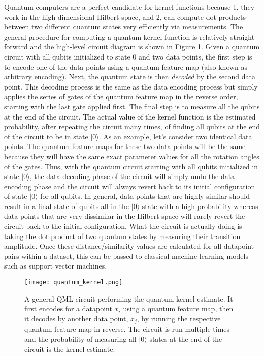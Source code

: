 \documentclass[
	a4paper, %
	10pt, %
	unnumberedsections, %
	twoside, %
]{LTJournalArticle}
\newcommand{\ket}[1]{\lvert#1\rangle} %
\begin{document}
Quantum computers are a perfect candidate for kernel functions because 1, they work in the high-dimensional Hilbert space, and 2, can compute dot products between two different quantum 
states very efficiently via measurements. The general procedure for computing a quantum kernel function is relatively straight forward and the high-level circuit diagram is shown in 
Figure \ref{fig:quantumkernel}. Given a quantum circuit with all qubits initialized to state 0 and two data points, the first step is to encode one of the data points using a quantum feature map (also known 
as arbitrary encoding). Next, the quantum state is then \emph{decoded} by the second data point. This decoding process is the same as the data encoding process but simply applies the series 
of gates of the quantum feature map in the reverse order, starting with the last gate applied first. The final step is to measure all the qubits at the end of the circuit. The actual value 
of the kernel function is the estimated probability, after repeating the circuit many times, of finding all qubits at the end of the circuit to be in state $\ket{0}$. As an example, 
let's consider two identical data points. The quantum feature maps for these two data points will be the same because they will have the same exact parameter values for all the rotation 
angles of the gates. Thus, with the quantum circuit starting with all qubits initialized in state $\ket{0}$, the data decoding phase of the circuit will simply undo the data encoding phase 
and the circuit will always revert back to its initial configuration of state $\ket{0}$ for all qubits. In general, data points that are highly similar should result in a final state of 
qubits all in the $\ket{0}$ state with a high probability whereas data points that are very dissimilar in the Hilbert space will rarely revert the circuit back to the initial configuration. 
What the circuit is actually doing is taking the dot product of two quantum states by measuring their transition amplitude. Once these distance/similarity values are calculated for all 
datapoint pairs within a dataset, this can be passed to classical machine learning models such as support vector machines.

\begin{figure} %
	\texttt{[image: quantum\_kernel.png]}
	\caption{A general QML circuit performing the quantum kernel estimate. It first encodes for a datapoint $x_i$ using a quantum feature map, then it decodes
	by another data point, $x_j$, by running the respective quantum feature map in reverse. The circuit is run multiple times and the probability of measuring
	all $\ket{0}$ states at the end of the circuit is the kernel estimate.}
	\label{fig:quantumkernel}
\end{figure}
\end{document}
